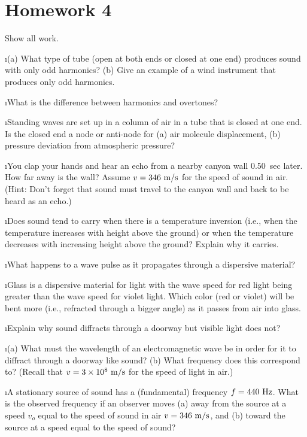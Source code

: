 \section{Homework 4}

\noindent
Show all work.

\ben

\i (a) 
What type of tube (open at both ends or
closed at one end) produces sound with only odd
harmonics?
(b) Give an example of a wind instrument that
produces only odd harmonics.

\i What is the difference between harmonics and
overtones?

\i Standing waves are set up in a column of air
in a tube that is closed at one end.
Is the closed end a node or anti-node for 
(a) air molecule displacement,
(b) pressure deviation from atmospheric pressure?

\i You clap your hands and hear an echo from a nearby
canyon wall 0.50~sec later.
How far away is the wall?
Assume $v=346~{\rm m/s}$ for the speed of sound in air.
(Hint: Don't forget that sound must travel to the 
canyon wall and back to be heard as an echo.)

\i Does sound tend to carry when there is a temperature
inversion (i.e., when the temperature increases with
height above the ground) or when the temperature 
decreases with increasing height above the ground?
Explain why it carries.

\i What happens to a wave pulse as it propagates
through a dispersive material?

\i Glass is a dispersive material for light with
the wave speed for red light being greater than
the wave speed for violet light.
Which color (red or violet) will be bent more 
(i.e., refracted through a bigger angle) as it passes from air 
into glass.

\i Explain why sound diffracts through a doorway but 
visible light does not?

\i (a) What must the wavelength of an electromagnetic
wave be in order for it to diffract through a doorway
like sound?
(b) What frequency does this correspond to?
(Recall that $v=3\times 10^8~{\rm m/s}$ for the speed
of light in air.)

\i A stationary source of sound has a (fundamental) 
frequency $f=440~{\rm Hz}$.
What is the observed frequency if an observer moves
(a) away from the source at a speed $v_o$ equal to 
the speed of sound in air $v=346~{\rm m/s}$, and
(b) toward the source at a speed equal to the speed of sound?

\een

